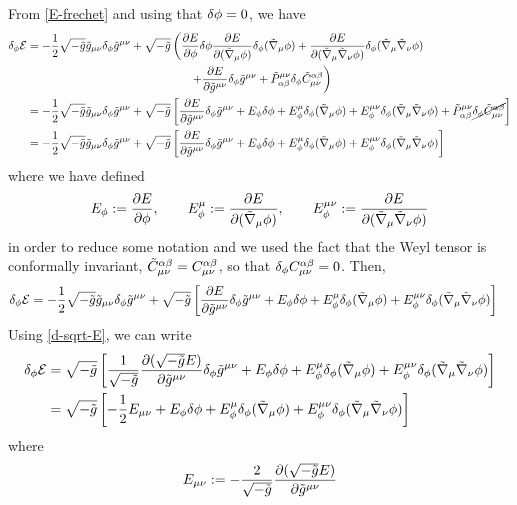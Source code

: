 From \eqref{E-frechet} and using that $\delta \phi=0$, we have
\begin{align*}
  \d_\f \E&=-\frac{1}{2}\sqrt{-\tilde{g}}\tilde{g}_{\m\n }\d_\f \tilde{g}^{\m\n }+\sqrt{-\tilde{g}}\left(\pdv{E}{\f }\d\f \pdv{E}{(\tilde{\nabla}_\m\f )}\d_\f(\tilde{\nabla}_\m\f )+\pdv{E}{(\tilde{\nabla}_\m\tilde{\nabla}_\n\f )}\d_\f(\tilde{\nabla}_\m\tilde{\nabla}_\n \f )\right.\\&\hspace{5cm}\left.+\pdv{E}{\tilde{g}^{\m\n }}\d_\f\tilde{g}^{\m\n }+\tilde{P}^{\m\n }_{\a\b }\d_\f \tilde{C}^{\a\b }_{\m\n }\right)\\
  &=-\frac{1}{2}\sqrt{-\tilde{g}}\tilde{g}_{\m\n }\d_\f \tilde{g}^{\m\n }+\sqrt{-\tilde{g}}\left[\pdv{E}{\tilde{g}^{\m\n }}\d_\f\tilde{g}^{\m\n }+ E_\f\d\f +E^\m_\f \d_\f(\tilde{\nabla}_\m\f )+E^{\m\n }_\f \d_\f(\tilde{\nabla}_\m\tilde{\nabla}_\n\f )+\tilde{P}^{\m\n }_{\a\b }\cancel{\d_\f \tilde{C}^{\a\b }_{\m\n }}\right]\\
  &=-\frac{1}{2}\sqrt{-\tilde{g}}\tilde{g}_{\m\n }\d_\f \tilde{g}^{\m\n }+\sqrt{-\tilde{g}}\left[\pdv{E}{\tilde{g}^{\m\n }}\d_\f\tilde{g}^{\m\n }+ E_\f\d\f +E^\m_\f \d_\f(\tilde{\nabla}_\m\f )+E^{\m\n }_\f \d_\f(\tilde{\nabla}_\m\tilde{\nabla}_\n\f )\right]
\end{align*}
where we have defined
\begin{equation}
  E_\phi:=\pdv{E}{\phi},\qquad E^\mu_\phi:=\pdv{E}{(\tilde{\nabla}_\mu\phi)},\qquad E^{\mu\nu }_\phi:=\pdv{E}{(\tilde{\nabla}_\mu\tilde{\nabla}_\nu\phi)}
\end{equation}
in order to reduce some notation and we used the fact that the Weyl tensor is conformally invariant, $\tilde{C}^{\alpha\beta }_{\mu\nu }=C^{\alpha\beta }_{\mu\nu }$, so that $\delta_\phi C^{\alpha\beta }_{\mu\nu }=0$. Then,
\begin{align}
  \delta_\phi \mathcal{E} &=-\frac{1}{2}\sqrt{-\tilde{g}}\tilde{g}_{\mu\nu }\delta_\phi \tilde{g}^{\mu\nu }+\sqrt{-\tilde{g}}\left[\pdv{E}{\tilde{g}^{\mu\nu}}\delta_\phi\tilde{g}^{\mu\nu }+ E_\phi\delta\phi +E^\mu_\phi \delta_\phi(\tilde{\nabla}_\mu\phi )+E^{\mu\nu }_\phi \delta_\phi(\tilde{\nabla}_\mu\tilde{\nabla}_\nu\phi )\right]
\end{align}
Using \eqref{d-sqrt-E}, we can write
\begin{align}
  \delta_\phi \mathcal{E} &=\sqrt{-\tilde{g}}\left[\frac{1}{\sqrt{-\tilde{g}}}\pdv{(\sqrt{-\tilde{g}}E)}{\tilde{g}^{\mu\nu}}\delta_\phi\tilde{g}^{\mu\nu }+ E_\phi\delta\phi +E^\mu_\phi \delta_\phi(\tilde{\nabla}_\mu\phi )+E^{\mu\nu }_\phi \delta_\phi(\tilde{\nabla}_\mu\tilde{\nabla}_\nu\phi )\right]\\
  &=\sqrt{-\tilde{g}}\left[-\frac{1}{2}E_{\mu\nu }+ E_\phi\delta\phi +E^\mu_\phi \delta_\phi(\tilde{\nabla}_\mu\phi )+E^{\mu\nu }_\phi \delta_\phi(\tilde{\nabla}_\mu\tilde{\nabla}_\nu\phi )\right]\label{df-E}
\end{align}
where 
\begin{equation}
  E_{\mu\nu }:=-\frac{2}{\sqrt{-\tilde{g}}}\pdv{(\sqrt{-\tilde{g}}E)}{\tilde{g}^{\mu\nu}}
\end{equation}








